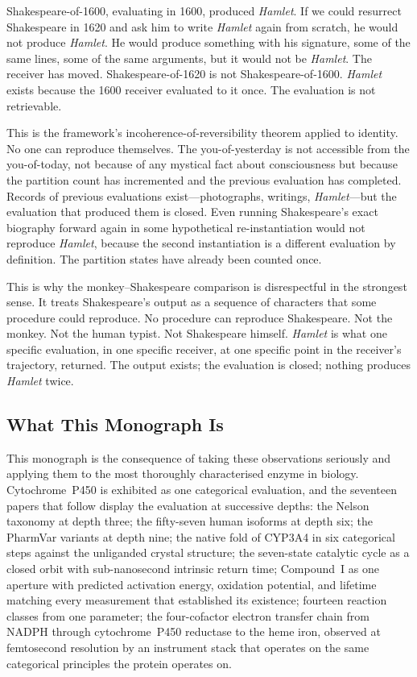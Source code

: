 \documentclass[11pt,twocolumn,a4paper]{article}
\theoremstyle{definition}
\theoremstyle{remark}
\begin{document}
Shakespeare-of-1600, evaluating in 1600, produced \textit{Hamlet}.  If we
could resurrect Shakespeare in 1620 and ask him to write \textit{Hamlet} again
from scratch, he would not produce \textit{Hamlet}.  He would produce something
with his signature, some of the same lines, some of the same arguments, but it
would not be \textit{Hamlet}.  The receiver has moved.  Shakespeare-of-1620 is
not Shakespeare-of-1600.  \textit{Hamlet} exists because the 1600 receiver
evaluated to it once.  The evaluation is not retrievable.

This is the framework's incoherence-of-reversibility theorem applied to
identity.  No one can reproduce themselves.  The you-of-yesterday is not
accessible from the you-of-today, not because of any mystical fact about
consciousness but because the partition count has incremented and the previous
evaluation has completed.  Records of previous evaluations exist---photographs,
writings, \textit{Hamlet}---but the evaluation that produced them is closed.
Even running Shakespeare's exact biography forward again in some hypothetical
re-instantiation would not reproduce \textit{Hamlet}, because the second
instantiation is a different evaluation by definition.  The partition states
have already been counted once.

This is why the monkey--Shakespeare comparison is disrespectful in the
strongest sense.  It treats Shakespeare's output as a sequence of characters
that some procedure could reproduce.  No procedure can reproduce Shakespeare.
Not the monkey.  Not the human typist.  Not Shakespeare himself.
\textit{Hamlet} is what one specific evaluation, in one specific receiver, at
one specific point in the receiver's trajectory, returned.  The output exists;
the evaluation is closed; nothing produces \textit{Hamlet} twice.

\subsection{What This Monograph Is}

This monograph is the consequence of taking these observations seriously and
applying them to the most thoroughly characterised enzyme in biology.
Cytochrome~P450 is exhibited as one categorical evaluation, and the seventeen
papers that follow display the evaluation at successive depths: the Nelson
taxonomy at depth three; the fifty-seven human isoforms at depth six; the
PharmVar variants at depth nine; the native fold of CYP3A4 in six categorical
steps against the unliganded crystal structure; the seven-state catalytic cycle
as a closed orbit with sub-nanosecond intrinsic return time; Compound~I as one
aperture with predicted activation energy, oxidation potential, and lifetime
matching every measurement that established its existence; fourteen reaction
classes from one parameter; the four-cofactor electron transfer chain from
NADPH through cytochrome~P450 reductase to the heme iron, observed at
femtosecond resolution by an instrument stack that operates on the same
categorical principles the protein operates on.
\end{document}
